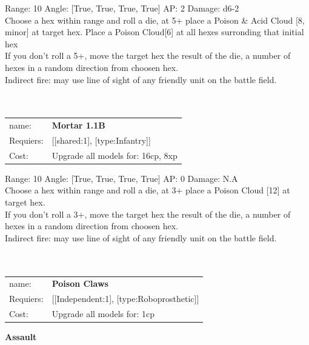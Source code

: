 {Range: 10  Angle: [True, True, True, True] AP: 2 Damage: d6-2 \\
Choose a hex within range and roll a die, at 5+ place a Poison \& Acid Cloud [8, minor] at target hex. Place a Poison Cloud[6]  at all hexes surronding that initial hex\\ 
If you don't roll a 5+, move the target hex the result of the die, a number of hexes in a random direction from choosen hex.\\ 
Indirect fire: may use line of sight of any friendly unit on the battle field.\\ 








\ \\
\ \\
\begin{tabular}{ll}
name: & {\bf Mortar 1.1B } \\
Requiers: & [[shared:1], [type:Infantry]] \\
Cost: & Upgrade all models for: 16cp, 8xp \\
\end{tabular}



Range: 10  Angle: [True, True, True, True] AP: 0 Damage: N.A \\
Choose a hex within range and roll a die, at 3+ place a Poison Cloud [12] at target hex.\\ 
If you don't roll a 3+, move the target hex the result of the die, a number of hexes in a random direction from choosen hex.\\ 
Indirect fire: may use line of sight of any friendly unit on the battle field.\\ 








\ \\
\ \\
\begin{tabular}{ll}
name: & {\bf Poison Claws } \\
Requiers: & [[Independent:1], [type:Roboprosthetic]] \\
Cost: & Upgrade all models for: 1cp \\
\end{tabular}





{\bf Assault} \ \\

}
